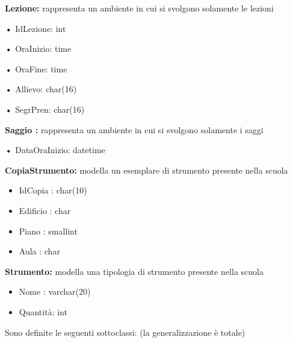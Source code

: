 \documentclass{article}
\begin{document}
\textbf{Lezione: }rappresenta un ambiente in cui si svolgono solamente le lezioni %
\begin{description}
	\item \hspace{2em} \textbf{•} IdLezione: int 
	\item \hspace{2em} \textbf{•} OraInizio: time
	\item \hspace{2em} \textbf{•} OraFine: time
	\item \hspace{2em} \textbf{•} Allievo: char(16)
	\item \hspace{2em} \textbf{•} SegrPren: char(16)
\end{description}

\medskip


\textbf{Saggio : }rappresenta un ambiente in cui si svolgono solamente i saggi
\begin{description}
	\item \hspace{2em} \textbf{•} DataOraInizio: datetime
\end{description}


\medskip

\begin{flushleft}
\textbf{CopiaStrumento: }modella un esemplare di strumento presente nella scuola
\end{flushleft}

\begin{itemize}
\item IdCopia : char(10)
\item Edificio : char
\item Piano : smallint
\item Aula : char
\end{itemize}


\begin{flushleft}
\textbf{Strumento: }modella una tipologia di strumento presente nella scuola
\end{flushleft}

\begin{itemize}
	\item Nome : varchar(20)
	\item Quantità: int
\end{itemize}


\begin{flushleft}
Sono definite le seguenti sottoclassi: (la generalizzazione è totale)\\
\end{flushleft}
\end{document}
